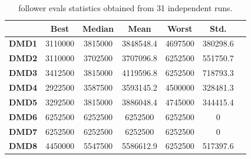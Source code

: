 \documentclass[conference]{IEEEtran}
\begin{document}
\begin{table}[!t]
\renewcommand{\arraystretch}{1.3}
    \caption{follower evals statistics obtained from 31 independent runs.}
    \label{tab:follower}
    \centering
    \begin{tabular}{|c|c|c|c|c|c|c|}
\hline
&\textbf{Best}&\textbf{Median}&\textbf{Mean}&\textbf{Worst}&\textbf{Std.}\\ \hline 
\textbf{DMD1} & 3110000  & 3815000  & 3848548.4  & 4697500  & 380298.6 \\ \hline
\textbf{DMD2} & 3110000  & 3702500  & 3707096.8  & 6252500  & 551750.7 \\ \hline
\textbf{DMD3} & 3412500  & 3815000  & 4119596.8  & 6252500  & 718793.3 \\ \hline
\textbf{DMD4} & 2922500  & 3587500  & 3593145.2  & 4500000  & 328481.3 \\ \hline
\textbf{DMD5} & 3292500  & 3815000  & 3886048.4  & 4745000  & 344415.4 \\ \hline
\textbf{DMD6} & 6252500  & 6252500  & 6252500  & 6252500  & 0 \\ \hline
\textbf{DMD7} & 6252500  & 6252500  & 6252500  & 6252500  & 0 \\ \hline
\textbf{DMD8} & 4450000  & 5547500  & 5586612.9  & 6252500  & 517397.6 \\ \hline
    \end{tabular}
\end{table}

\end{document}

